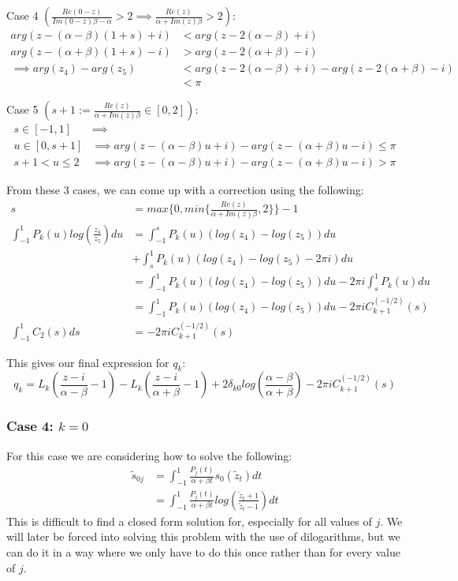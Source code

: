 \documentclass{article}
\begin{document}
Case 4 $(\frac{Re(0-z)}{Im(0-z)\beta-\alpha}>2\implies\frac{Re(z)}{\alpha+Im(z)\beta}>2)$:
\begin{align}
    arg(z-(\alpha-\beta)(1+s)+i)&<arg(z-2(\alpha-\beta)+i)\\
    arg(z-(\alpha+\beta)(1+s)-i)&>arg(z-2(\alpha+\beta)-i)\\
    \implies arg(z_4)-arg(z_5)&<arg(z-2(\alpha-\beta)+i)-arg(z-2(\alpha+\beta)-i)\\
    &<\pi
\end{align}

Case 5 $(s+1:=\frac{Re(z)}{\alpha+Im(z)\beta}\in[0,2])$:
\begin{align}
    s\in[-1,1] &\implies\\
    u\in[0,s+1] &\implies arg(z-(\alpha-\beta)u+i)-arg(z-(\alpha+\beta)u-i)\leq\pi\\
    s+1<u\leq2 &\implies arg(z-(\alpha-\beta)u+i)-arg(z-(\alpha+\beta)u-i)>\pi
\end{align}

From these 3 cases, we can come up with a correction using the following:
\begin{align}
    s &= max\{0, min\{\frac{Re(z)}{\alpha+Im(z)\beta},2\}\}-1\\
    \int_{-1}^1P_k(u)log(\frac{z_4}{z_5})du &=\int_{-1}^sP_k(u)(log(z_4)-log(z_5))du\\
    &+\int_s^1P_k(u)(log(z_4)-log(z_5)-2\pi i)du\\
    &=\int_{-1}^1P_k(u)(log(z_4)-log(z_5))du-2\pi i\int_s^1P_k(u)du\\
    &=\int_{-1}^1P_k(u)(log(z_4)-log(z_5))du-2\pi iC_{k+1}^{(-1/2)}(s)\\
    \int_{-1}^1C_2(s)ds &= -2\pi iC_{k+1}^{(-1/2)}(s)
\end{align}

This gives our final expression for $q_k$:
$$q_k=L_k(\frac{z-i}{\alpha-\beta}-1)-L_k(\frac{z-i}{\alpha+\beta}-1)
+2\delta_{k0}log(\frac{\alpha-\beta}{\alpha+\beta})-2\pi i C_{k+1}^{(-1/2)}(s)$$

\subsubsection*{Case 4: $k=0$}
For this case we are considering how to solve the following:
\begin{align}
    \tilde{s}_{0j} &= \int_{-1}^1\frac{P_j(t)}{\alpha+\beta t}s_0(\tilde{z}_t)dt\\
    &= \int_{-1}^1\frac{P_j(t)}{\alpha+\beta t}log(\frac{\tilde{z}_t+1}{\tilde{z}_t-1})dt
\end{align}
This is difficult to find a closed form solution for, especially for all values of $j$.
We will later be forced into solving this problem with the use of dilogarithms, but we can do it in a way where we only have to do this once rather than for every value of $j$.
\end{document}
